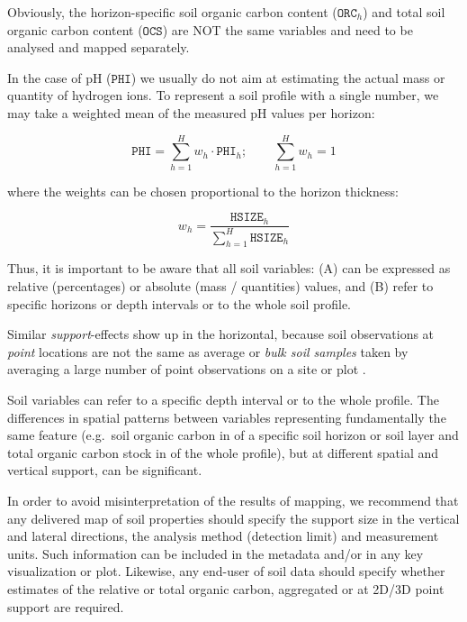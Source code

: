 \documentclass[graybox,natbib,nospthms,UStrade]{svmono}
\let\BeginKnitrBlock\begin \let\EndKnitrBlock\end
\let\BeginKnitrBlock\begin \let\EndKnitrBlock\end
\begin{document}
Obviously, the horizon-specific soil organic carbon content
(\(\mathtt{ORC}_h\)) and total soil organic carbon content
(\(\mathtt{OCS}\)) are NOT the same variables and need to be analysed and
mapped separately.

In the case of pH (\(\mathtt{PHI}\)) we usually do not aim at estimating
the actual mass or quantity of hydrogen ions. To represent a soil
profile with a single number, we may take a weighted mean of the
measured pH values per horizon:

\begin{equation}
\mathtt{PHI} = \sum\limits_{h = 1}^H { w_h \cdot \mathtt{PHI}_h }; \qquad \sum\limits_{h = 1}^H{w_h} = 1
\label{eq:pHmean}
\end{equation}

where the weights can be chosen proportional to the horizon thickness:

\begin{equation}
w _h  = \frac{{\mathtt{HSIZE}_h}}{\sum\limits_{h = 1}^H {{\mathtt{HSIZE}}_h}}
\end{equation}

Thus, it is important to be aware that all soil variables: (A) can be
expressed as relative (percentages) or absolute (mass / quantities)
values, and (B) refer to specific horizons or depth intervals or to the
whole soil profile.

Similar \emph{support}-effects show up in the horizontal,
because soil observations at \emph{point} locations are not the same as
average or \emph{bulk soil samples} taken by averaging a large number of
point observations on a site or plot \citep{Webster2001Wiley}.

\BeginKnitrBlock{rmdnote}
Soil variables can refer to a specific depth interval or to the whole
profile. The differences in spatial patterns between variables
representing fundamentally the same feature (e.g.~soil organic carbon in
of a specific soil horizon or soil layer and total organic carbon stock
in of the whole profile), but at different spatial and vertical support,
can be significant.
\EndKnitrBlock{rmdnote}

In order to avoid misinterpretation of the results of mapping, we
recommend that any delivered map of soil properties should specify the
support size in the vertical and lateral directions, the analysis method
(detection limit) and measurement units. Such information can be
included in the metadata and/or in any key visualization or plot.
Likewise, any end-user of soil data should specify whether estimates of
the relative or total organic carbon, aggregated or at 2D/3D point
support are required.
\end{document}
